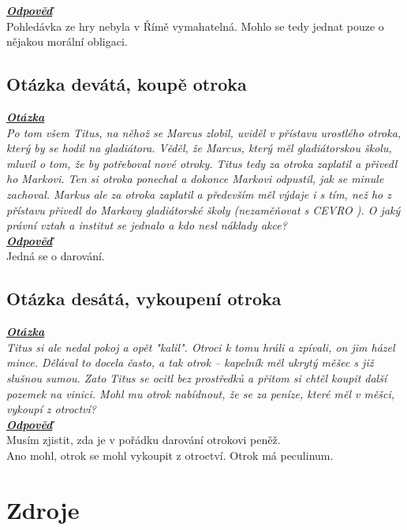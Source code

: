 \documentclass{article}
\begin{document}
\noindent\noindent\textbf{\textit{\underline{Odpověď}}}\\

Pohledávka ze hry nebyla v Římě vymahatelná. Mohlo se tedy jednat pouze o nějakou morální obligaci.

\subsection{Otázka devátá, koupě otroka}
\textbf{\textit{\underline{Otázka}}}\\
\textit{Po tom všem Titus, na něhož se Marcus zlobil, uviděl v přístavu urostlého otroka, který by se hodil na gladiátora. Věděl, že Marcus, který měl gladiátorskou školu, mluvil o tom, že by potřeboval nové otroky. Titus tedy za otroka zaplatil a přivedl ho Markovi. Ten si otroka ponechal a dokonce Markovi odpustil, jak se minule zachoval. Markus ale za otroka zaplatil a především měl výdaje i s tím, než ho z přístavu přivedl do Markovy gladiátorské školy (nezaměňovat s CEVRO ). O jaký právní vztah a institut se jednalo a kdo nesl náklady akce?}\\

\noindent\noindent\textbf{\textit{\underline{Odpověď}}}\\

Jedná se o darování.

\subsection{Otázka desátá, vykoupení otroka}
\textbf{\textit{\underline{Otázka}}}\\
\textit{Titus si ale nedal pokoj a opět "kalil". Otroci k tomu hráli a zpívali, on jim házel mince. Dělával to docela často, a tak otrok – kapelník měl ukrytý měšec s již slušnou sumou. Zato Titus se ocitl bez prostředků a přitom si chtěl koupit další pozemek na vinici. Mohl mu otrok nabídnout, že se za peníze, které měl v měšci, vykoupí z otroctví?}\\

\noindent\noindent\textbf{\textit{\underline{Odpověď}}}\\

Musím zjistit, zda je v pořádku darování otrokovi peněž.\\
Ano mohl, otrok se mohl vykoupit z otroctví.
Otrok má peculinum.

\newpage
\thispagestyle{Contents}
\section*{Zdroje}
\setcounter{SecZdroje}{\thesection}
\addtocounter{SecZdroje}{1}
\printbibliography[type=misc,heading=subbibliography,title={Online zdroje}]
\printbibliography[type=book,heading=subbibliography,title={Knižní zdroje}]
\printbibliography[type=article,heading=subbibliography,title={Články}]
\end{document}
